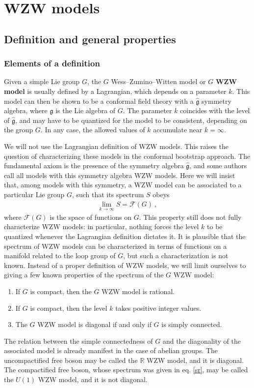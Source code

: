 \documentclass[12pt, a4paper, notitlepage, twoside]{report}
\numberwithin{equation}{section}
\theoremstyle{break}
\begin{document}
\section{WZW models}

\subsection{Definition and general properties}

\subsubsection{Elements of a definition}

Given a simple Lie group $G$, the $G$ Wess--Zumino--Witten model or $G$ \textbf{\boldmath WZW model} is usually defined by a Lagrangian, which depends on a parameter $k$.
This model can then be shown to be a conformal field theory with a $\hat{\mathfrak{g}}$ symmetry algebra, where $\mathfrak{g}$ is the Lie algebra of $G$.
The parameter $k$ coincides with the level of $\hat{\mathfrak{g}}$, and may have to be quantized for the model to be consistent, depending on the group $G$.
In any case, the allowed values of $k$ accumulate near $k=\infty$.

We will not use the Lagrangian definition of WZW models.
This raises the question of characterizing these models in the conformal bootstrap approach.
The fundamental axiom is the presence of the symmetry algebra $\hat{\mathfrak{g}}$, and some  authors call all models with this symmetry algebra WZW models.
Here we will insist that, among models with this symmetry, 
a WZW model can be associated to a particular Lie group $G$, such that its spectrum $S$ obeys
\begin{align}
 \boxed{\underset{k\to \infty}{\lim} S = \mathcal{F}(G)}\ ,
\label{lsfg}
\end{align}
where $\mathcal{F}(G)$ is the space of functions on $G$.
This property still does not fully characterize WZW models: in particular, nothing forces the level $k$ to be quantized whenever the Lagrangian definition dictates it.
It is plausible that the spectrum of WZW models can be characterized in terms of functions on a manifold related to the loop group of $G$, but such a characterization is not known.
Instead of a proper definition of WZW models, we will limit ourselves to giving a few known properties of the spectrum of the $G$ WZW model:
\begin{enumerate}
 \item If $G$ is compact, then the $G$ WZW model is rational.
\item If $G$ is compact, then the level $k$ takes positive integer values.
\item The $G$ WZW model is diagonal if and only if $G$ is simply connected. 
\end{enumerate}
The relation between the simple connectedness of $G$ and the diagonality of the associated model is already manifest in the case of abelian groups.
The uncompactified free boson may be called the ${\mathbb{R}}$ WZW model, and it is diagonal.
The compactified free boson, whose spectrum was given in eq. \eqref{sr}, may be called the $U(1)$ WZW model, and it is not diagonal. 
\end{document}
